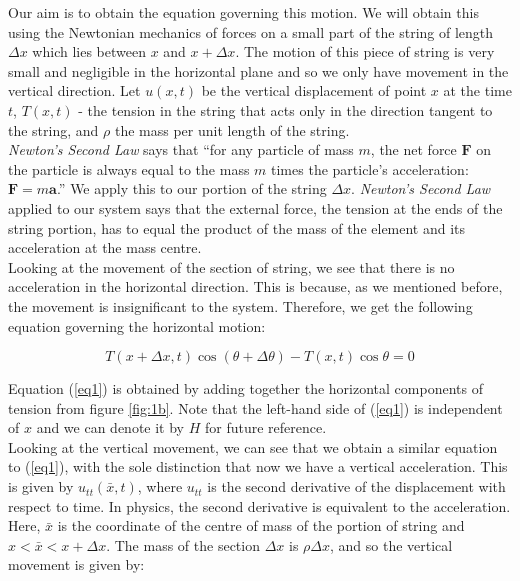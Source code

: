 \documentclass[12pt]{article}
\numberwithin{equation}{section}
\begin{document}
Our aim is to obtain the equation governing this motion. We will obtain this using the Newtonian
mechanics of forces on a small part of the string of length $\Delta x$ which lies between $x$ and 
$x+\Delta x$. The motion of this piece of string is very small and negligible in the horizontal plane
and so we only have movement
in the vertical direction. \cite{Kr} Let $u(x,t)$ be the vertical displacement of point $x$ at the time $t$, 
$T(x,t)$ - the tension in the string that acts only in the direction tangent to the string, and $\rho$ the 
mass per unit length of the string. 
\\

\emph{Newton's Second Law} says that ``for any particle of mass $m$, the net force 
$\boldsymbol{F}$ on the particle is always equal to the mass $m$ times the particle's 
acceleration: $\boldsymbol{F} = m \boldsymbol{a}$.'' \cite{Tay} We apply this to our 
portion of the string $\Delta x$. \emph{Newton's Second Law} applied to our system says that the external
force, the tension at the ends of the string portion, has to equal the product of the mass of the element and 
its acceleration at the mass centre. 
\\

Looking at the movement of the section of string, we see that there is no acceleration in the horizontal direction. 
This is because, as we mentioned before, the movement is insignificant to the system. Therefore, we get the 
following equation governing the horizontal motion:

\begin {equation} \label{eq1}
    T(x+\Delta x,t)\cos{(\theta + \Delta \theta)}-T(x,t)\cos{\theta}=0
\end {equation}

Equation (\ref{eq1}) is obtained by adding together the horizontal components of tension from figure \ref{fig:1b}. Note that the left-hand
side of (\ref{eq1}) is independent of $x$ and we can denote it by $H$ for future reference.
\\

Looking at the vertical movement, we can see that we obtain a similar equation to (\ref{eq1}), with the sole distinction
that now we have a vertical acceleration. This is given by $u_{tt} (\bar{x},t)$, where $u_{tt}$ is the second derivative
of the displacement with respect to time. In physics, the second derivative is equivalent to the acceleration. Here,
 $\bar{x}$ is the coordinate of the centre of mass of the portion of string and $x<\bar{x}<x+\Delta x$. The mass of the 
 section $\Delta x$ is $\rho\Delta x$, and so the vertical movement is given by:
\end{document}
